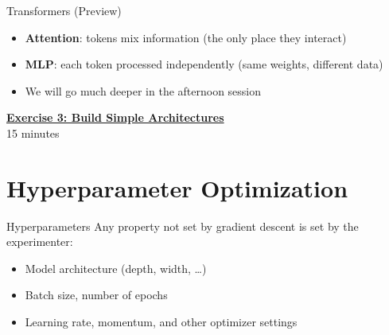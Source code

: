 \documentclass[aspectratio=169]{beamer}
\begin{document}
\begin{frame}{Transformers (Preview)}
\begin{center}
\end{center}
\vspace{-0.5em}
\begin{itemize}
\item \textbf{Attention}: tokens mix information (the only place they interact)
\item \textbf{MLP}: each token processed independently (same weights, different data)
\item We will go much deeper in the afternoon session
\end{itemize}
\hfill{\tiny \cite{vaswani2017}}\quad
\end{frame}

\begin{frame}{}
\centering
\Large \href{https://colab.research.google.com/github/wusche1/Illiad_ML_Engineering/blob/main/lectures/01_a_ml_foundations/exercises/03_architectures/notebook.ipynb}{\textbf{Exercise 3: Build Simple Architectures}} \\[1em]
\normalsize 15 minutes \\[1em]
\end{frame}

\section{Hyperparameter Optimization}

\begin{frame}{Hyperparameters}
Any property not set by gradient descent is set by the experimenter:
\begin{itemize}
\item Model architecture (depth, width, \ldots)
\item Batch size, number of epochs
\item Learning rate, momentum, and other optimizer settings
\end{itemize}
\end{frame}
\end{document}
